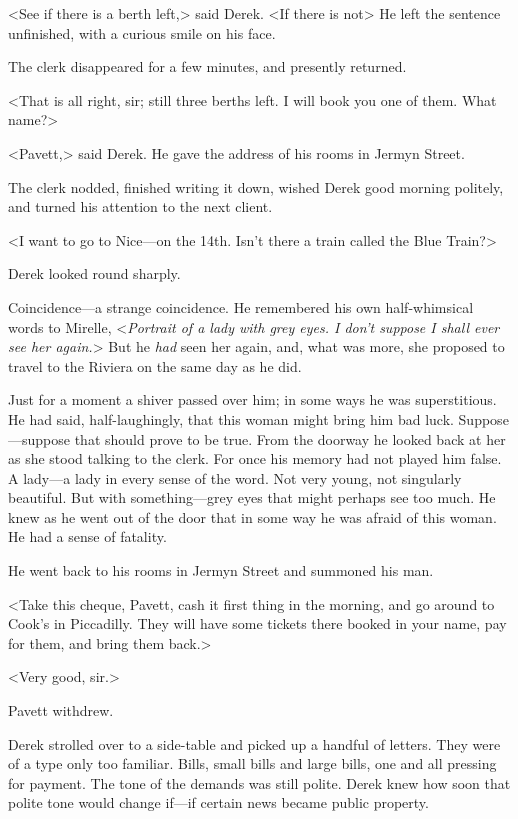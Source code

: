 <See if there is a berth left,> said Derek. <If there is not\longdash> He left the sentence unfinished, with a curious smile on his face.

The clerk disappeared for a few minutes, and presently returned.

<That is all right, sir; still three berths left. I will book you one of them. What name?>

<Pavett,> said Derek. He gave the address of his rooms in Jermyn Street.

The clerk nodded, finished writing it down, wished Derek good morning politely, and turned his attention to the next client.

<I want to go to Nice—on the 14th. Isn't there a train called the Blue Train?>

Derek looked round sharply.

Coincidence—a strange coincidence. He remembered his own half-whimsical words to Mirelle, <\emph{Portrait of a lady with grey eyes. I don't suppose I shall ever see her again.}> But he \emph{had} seen her again, and, what was more, she proposed to travel to the Riviera on the same day as he did.

Just for a moment a shiver passed over him; in some ways he was superstitious. He had said, half-laughingly, that this woman might bring him bad luck. Suppose—suppose that should prove to be true. From the doorway he looked back at her as she stood talking to the clerk. For once his memory had not played him false. A lady—a lady in every sense of the word. Not very young, not singularly beautiful. But with something—grey eyes that might perhaps see too much. He knew as he went out of the door that in some way he was afraid of this woman. He had a sense of fatality.

He went back to his rooms in Jermyn Street and summoned his man.

<Take this cheque, Pavett, cash it first thing in the morning, and go around to Cook's in Piccadilly. They will have some tickets there booked in your name, pay for them, and bring them back.>

<Very good, sir.>

Pavett withdrew.

Derek strolled over to a side-table and picked up a handful of letters. They were of a type only too familiar. Bills, small bills and large bills, one and all pressing for payment. The tone of the demands was still polite. Derek knew how soon that polite tone would change if—if certain news became public property.

